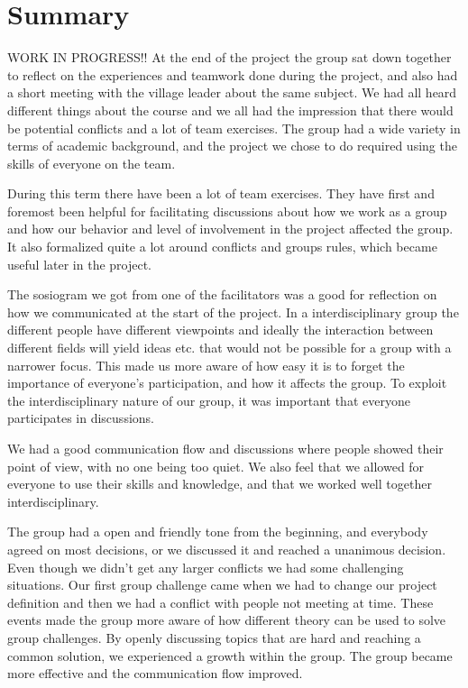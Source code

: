 \chapter{Summary}
\label{chap:reflection}

WORK IN PROGRESS!!
%
At the end of the project the group sat down together to reflect on the experiences and teamwork done during the project, and also had a short meeting with the village leader about the same subject. We had all heard different things about the course and we all had the impression that there would be potential conflicts and a lot of team exercises. The group had a wide variety in terms of academic background, and the project we chose to do required using the skills of everyone on the team.

During this term there have been a lot of team exercises. They have first and foremost been helpful for facilitating discussions about how we work as a group and how our behavior and level of involvement in the project affected the group. It also formalized quite a lot around conflicts and groups rules, which became useful later in the project. 

The sosiogram we got from one of the facilitators was a good for reflection on how we communicated at the start of the project. In a interdisciplinary group the different people have different viewpoints and ideally the interaction between different fields will yield ideas etc. that would not be possible for a group with a narrower focus. This made us more aware of how easy it is to forget the importance of everyone’s participation, and how it affects the group. To exploit the interdisciplinary nature of our group, it was important that everyone participates in discussions. 

We had a good communication flow and discussions where people showed their point of view, with no one being too quiet. We also feel that we allowed for everyone to use their skills and knowledge, and that we worked well together interdisciplinary.

The group had a open and friendly tone from the beginning, and everybody agreed on most decisions, or we discussed it and reached a unanimous decision. Even though we didn't get any larger conflicts we had some challenging situations. Our first group challenge came when we had to change our project definition and then we had a conflict with people not meeting at time. These events made the group more aware of how different theory can be used to solve group challenges. By openly discussing topics that are hard and reaching a common solution, we experienced a growth within the group. The group became more effective and the communication flow improved.

